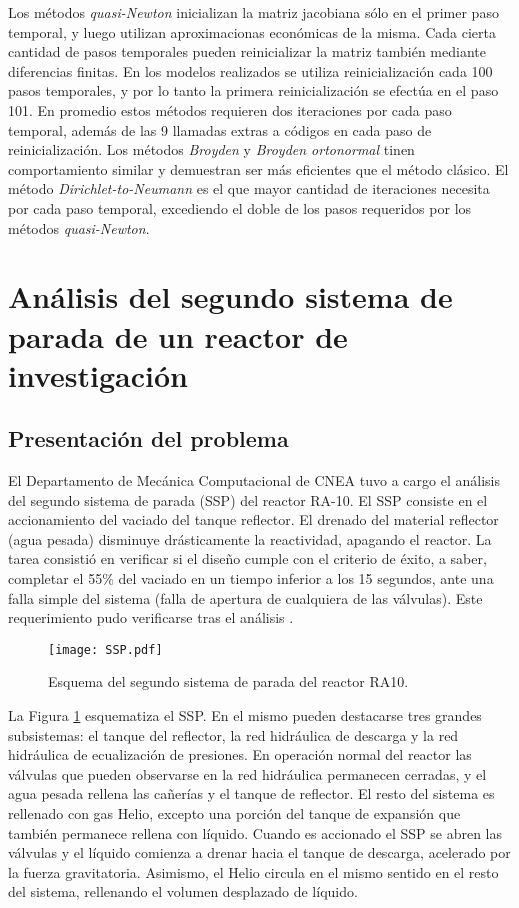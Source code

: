 Los métodos \textit{quasi-Newton} inicializan la matriz jacobiana sólo en el primer paso temporal,
y luego utilizan aproximacionas económicas de la misma. 
Cada cierta cantidad de pasos temporales pueden reinicializar la matriz también mediante diferencias finitas. 
En los modelos realizados se utiliza reinicialización cada 100 pasos temporales, 
y por lo tanto la primera reinicialización se efectúa en el paso 101.
En promedio estos métodos requieren dos iteraciones por cada paso temporal, 
además de las 9 llamadas extras a códigos en cada paso de reinicialización.
Los métodos \textit{Broyden} y \textit{Broyden ortonormal} tinen comportamiento similar y demuestran ser más eficientes que el método clásico.
El método \textit{Dirichlet-to-Neumann} es el que mayor cantidad de iteraciones necesita por cada paso temporal, 
excediendo el doble de los pasos requeridos por los métodos \textit{quasi-Newton}.

\section{Análisis del segundo sistema de parada de un reactor de investigación}
\label{3:mockup}

\subsection*{Presentación del problema}
El Departamento de Mecánica Computacional de CNEA tuvo a cargo el análisis del segundo sistema de parada (SSP) del reactor RA-10.
El SSP consiste en el accionamiento del vaciado del tanque reflector.
El drenado del material reflector (agua pesada) disminuye drásticamente la reactividad, apagando el reactor.
La tarea consistió en verificar si el diseño cumple con el criterio de éxito,
a saber, completar el 55\% del vaciado en un tiempo inferior a los 15 segundos,
ante una falla simple del sistema (falla de apertura de cualquiera de las válvulas).
Este requerimiento pudo verificarse tras el análisis \cite{cnea-informe-ra10}.

\begin{figure}[ht]
\centering{}\texttt{[image: SSP.pdf]}
\caption{Esquema del segundo sistema de parada del reactor RA10.} \label{fig:SSP} 
\end{figure}

La Figura \ref{fig:SSP} esquematiza el SSP. 
En el mismo pueden destacarse tres grandes subsistemas: el tanque del reflector, la red hidráulica de descarga y
la red hidráulica de ecualización de presiones. 
En operación normal del reactor las
válvulas que pueden observarse en la red hidráulica permanecen cerradas, y el agua pesada rellena las cañerías y el tanque de reflector. 
El resto del sistema es rellenado con gas Helio, excepto una porción del tanque de expansión que también permanece rellena con líquido. 
Cuando es accionado el SSP se abren las válvulas y el líquido comienza a drenar hacia el tanque de descarga, acelerado por la fuerza gravitatoria. 
Asimismo, el Helio circula en el mismo sentido en el resto del sistema, rellenando el volumen desplazado de líquido.

